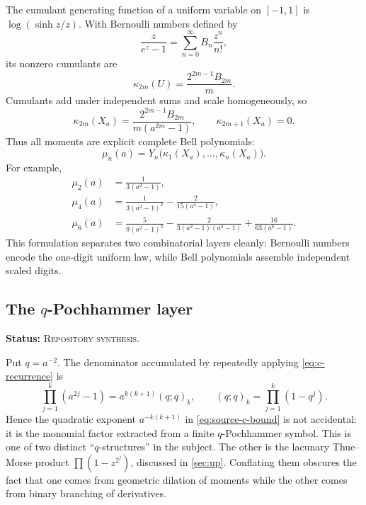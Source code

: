 \documentclass[11pt]{article}
\theoremstyle{definition}
\theoremstyle{remark}
\newcommand{\RepoStatus}{\textcolor{RepoOlive}{\textsc{Repository synthesis}}}
\newcommand{\status}[1]{\par\smallskip\noindent\textbf{Status:} #1.\par\smallskip}
\begin{document}
The cumulant generating function of a uniform variable on \([-1,1]\) is
\(\log(\sinh z/z)\).  With Bernoulli numbers defined by
\begin{equation}
  \frac{z}{e^z-1}=\sum_{n=0}^{\infty}B_n\frac{z^n}{n!},
  \label{eq:bernoulli-def}
\end{equation}
its nonzero cumulants are
\begin{equation}
  \kappa_{2m}(U)=\frac{2^{2m-1}B_{2m}}{m}.
  \label{eq:uniform-cumulants}
\end{equation}
Cumulants add under independent sums and scale homogeneously, so
\begin{equation}
  \boxed{\quad
  \kappa_{2m}(X_a)=
    \frac{2^{2m-1}B_{2m}}{m(a^{2m}-1)},
  \qquad \kappa_{2m+1}(X_a)=0.
  \quad}
  \label{eq:Xa-cumulants}
\end{equation}
Thus all moments are explicit complete Bell polynomials:
\begin{equation}
  \mu_n(a)=Y_n\bigl(\kappa_1(X_a),\ldots,\kappa_n(X_a)\bigr).
  \label{eq:bell-moments}
\end{equation}
For example,
\begin{align}
  \mu_2(a)&=\frac1{3(a^2-1)},
  \label{eq:mu2}\\
  \mu_4(a)&=\frac1{3(a^2-1)^2}-\frac{2}{15(a^4-1)},
  \label{eq:mu4}\\
  \mu_6(a)&=\frac{5}{9(a^2-1)^3}
    -\frac{2}{3(a^2-1)(a^4-1)}
    +\frac{16}{63(a^6-1)}.
  \label{eq:mu6}
\end{align}
This formulation separates two combinatorial layers cleanly: Bernoulli numbers encode the one-digit uniform law, while Bell polynomials assemble independent scaled digits.

\subsection{The \texorpdfstring{\(q\)}{q}-Pochhammer layer}
\status{\RepoStatus}

Put \(q=a^{-2}\).  The denominator accumulated by repeatedly applying \eqref{eq:c-recurrence} is
\begin{equation}
  \prod_{j=1}^{k}(a^{2j}-1)
   =a^{k(k+1)}(q;q)_k,
  \qquad (q;q)_k=\prod_{j=1}^{k}(1-q^j).
  \label{eq:qpoch-denominator}
\end{equation}
Hence the quadratic exponent \(a^{-k(k+1)}\) in \eqref{eq:source-c-bound} is not accidental: it is the monomial factor extracted from a finite \(q\)-Pochhammer symbol.  This is one of two distinct ``\(q\)-structures'' in the subject.  The other is the lacunary Thue--Morse product \(\prod(1-z^{2^j})\), discussed in \cref{sec:up}.  Conflating them obscures the fact that one comes from geometric dilation of moments while the other comes from binary branching of derivatives.
\end{document}
